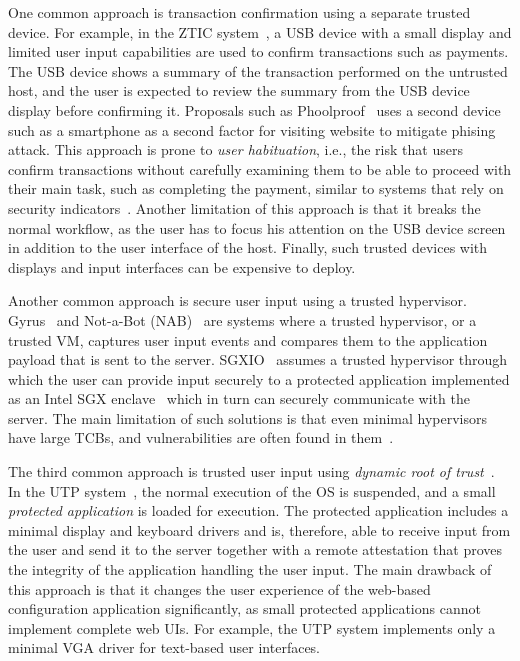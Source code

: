  One common approach is transaction confirmation using a separate trusted device. For example, in the ZTIC system~\cite{weigold2011}, a USB device with a small display and limited user input capabilities are used to confirm transactions such as payments. The USB device shows a summary of the transaction performed on the untrusted host, and the user is expected to review the summary from the USB device display before confirming it. Proposals such as Phoolproof~\cite{parno2006phoolproof} uses a second device such as a smartphone as a second factor for visiting website to mitigate phising attack. This approach is prone to \emph{user habituation}, i.e., the risk that users confirm transactions without carefully examining them to be able to proceed with their main task, such as completing the payment, similar to systems that rely on security indicators~\cite{schechter2007emperor,197283,41927}. Another limitation of this approach is that it breaks the normal workflow, as the user has to focus his attention on the USB device screen in addition to the user interface of the host. Finally, such trusted devices with displays and input interfaces can be expensive to deploy. 

 Another common approach is secure user input using a trusted hypervisor. Gyrus~\cite{gyrus} and Not-a-Bot (NAB)~\cite{nab} are systems where a trusted hypervisor, or a trusted VM, captures user input events and compares them to the application payload that is sent to the server. SGXIO~\cite{weiser2017sgxio} assumes a trusted hypervisor through which the user can provide input securely to a protected application implemented as an Intel SGX enclave~\cite{sgx} which in turn can securely communicate with the server. The main limitation of such solutions is that even minimal hypervisors have large TCBs, and vulnerabilities are often found in them~\cite{hashizume2013analysis,perez2013characterizing}.

 The third common approach is trusted user input using \emph{dynamic root of trust}~\cite{mccune2008flicker}. In the UTP system~\cite{filyanov2011uni}, the normal execution of the OS is suspended, and a small \emph{protected application} is loaded for execution. The protected application includes a minimal display and keyboard drivers and is, therefore, able to receive input from the user and send it to the server together with a remote attestation that proves the integrity of the application handling the user input. The main drawback of this approach is that it changes the user experience of the web-based configuration application significantly, as small protected applications cannot implement complete web UIs. For example, the UTP system implements only a minimal VGA driver for text-based user interfaces.


